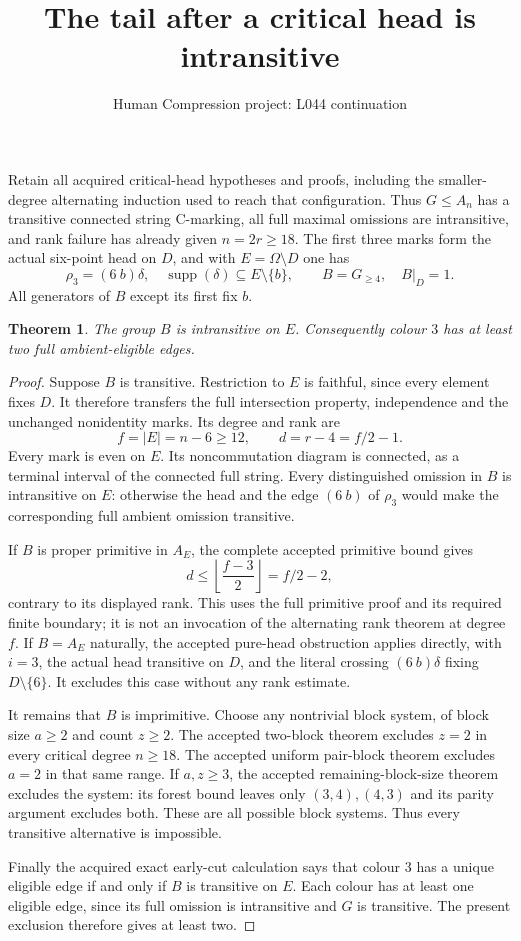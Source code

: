 \documentclass[11pt,a4paper]{article}
\title{The tail after a critical head is intransitive}
\author{Human Compression project: L044 continuation}
\date{}
\newtheorem{theorem}{Theorem}
\begin{document}
\maketitle
Retain all acquired critical-head hypotheses and proofs, including
the smaller-degree alternating induction used to reach that
configuration. Thus $G\le A_n$ has a transitive connected string
C-marking, all full maximal omissions are intransitive, and rank
failure has already given $n=2r\ge18$. The first three marks
form the actual six-point head on $D$, and with
$E=\Omega\setminus D$ one has
\[
 \rho_3=(6\ b)\delta,\quad
 \operatorname{supp}(\delta)\subseteq E\setminus\{b\},\qquad
 B=G_{\ge4},\quad B|_D=1.
\]
All generators of $B$ except its first fix $b$.

\begin{theorem}
The group $B$ is intransitive on $E$. Consequently colour $3$
has at least two full ambient-eligible edges.
\end{theorem}
\begin{proof}
Suppose $B$ is transitive. Restriction to $E$ is faithful,
since every element fixes $D$. It therefore transfers the
full intersection property, independence and the unchanged
nonidentity marks. Its degree and rank are
\[
                 f=|E|=n-6\ge12,\qquad
                 d=r-4=f/2-1.
\]
Every mark is even on $E$. Its noncommutation diagram is
connected, as a terminal interval of the connected full string.
Every distinguished omission in $B$ is intransitive on $E$:
otherwise the head and the edge $(6\ b)$ of $\rho_3$
would make the corresponding full ambient omission transitive.

If $B$ is proper primitive in $A_E$, the complete accepted
primitive bound gives
\[
 d\le\left\lfloor\frac{f-3}{2}\right\rfloor=f/2-2,
\]
contrary to its displayed rank. This uses the full primitive
proof and its required finite boundary; it is not an invocation
of the alternating rank theorem at degree $f$.
If $B=A_E$ naturally, the accepted pure-head obstruction
applies directly, with $i=3$, the actual head transitive on $D$,
and the literal crossing $(6\ b)\delta$ fixing $D\setminus\{6\}$.
It excludes this case without any rank estimate.

It remains that $B$ is imprimitive. Choose any nontrivial
block system, of block size $a\ge2$ and count $z\ge2$.
The accepted two-block theorem excludes $z=2$ in every critical
degree $n\ge18$. The accepted uniform pair-block theorem
excludes $a=2$ in that same range. If $a,z\ge3$, the
accepted remaining-block-size theorem excludes the system:
its forest bound leaves only $(3,4),(4,3)$ and its parity
argument excludes both. These are all possible block systems.
Thus every transitive alternative is impossible.

Finally the acquired exact early-cut calculation says that
colour $3$ has a unique eligible edge if and only if $B$ is
transitive on $E$. Each colour has at least one eligible edge,
since its full omission is intransitive and $G$ is transitive.
The present exclusion therefore gives at least two.
\end{proof}
\end{document}
